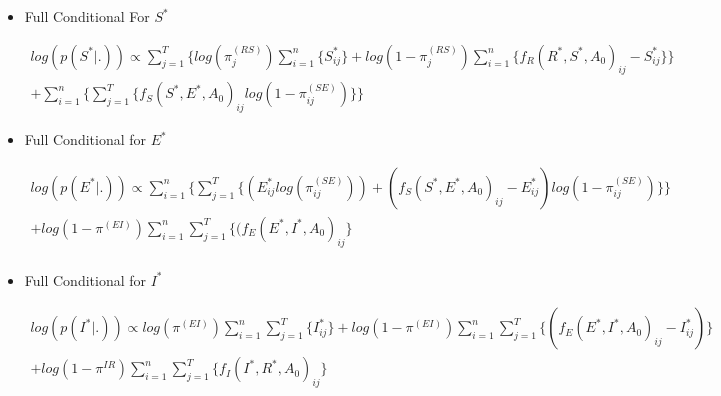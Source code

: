 \documentclass[12pt]{article}
\begin{document}
\begin{itemize}
    \item{Full Conditional For $S^*$}
    \begin{center}
        \begin{multline}
        \displaystyle
        log(p(S^*|.))\propto 
            \sum_{j=1}^T\Big\{log(\pi_j^{(RS)})\sum_{i=1}^n\{S^*_{ij}\} + 
                log(1-\pi_j^{(RS)})\sum_{i=1}^n\{f_R(R^*, S^*, A_0)_{ij} - S^*_{ij}\}\Big\}\\ 
                +\sum_{i=1}^n \bigg\{ \sum_{j=1}^T\Big\{
                f_S(S^*, E^*, A_0)_{ij}log(1-\pi_{ij}^{(SE)})\Big\}\bigg\}
        \end{multline}
    \end{center}

    \item{Full Conditional for $E^*$}
    \begin{center}
    \begin{multline}
        \displaystyle
        log(p(E^*|.))\propto \sum_{i=1}^n \bigg\{ \sum_{j=1}^T\Big\{
                (E^*_{ij}log(\pi_{ij}^{(SE)})) + (f_S(S^*, E^*, A_0)_{ij} - E^*_{ij})log(1-\pi_{ij}^{(SE)})\Big\}\bigg\} \\
                + log(1-\pi^{(EI)})\sum_{i=1}^n\sum_{j=1}^T\{(f_E(E^*, I^*, A_0)_{ij}\}\\
    \end{multline}
    \end{center}

    \item{Full Conditional for $I^*$}
    \begin{center}
    \begin{multline}
        \displaystyle
        log(p(I^*|.)) \propto log(\pi^{(EI)})\sum_{i=1}^n\sum_{j=1}^T\{I^*_{ij}\} 
            + log(1-\pi^{(EI)})\sum_{i=1}^n\sum_{j=1}^T\{(f_E(E^*, I^*, A_0)_{ij} - I^*_{ij})\}\\
            + log(1-\pi^{IR})\sum_{i=1}^n\sum_{j=1}^T\{ f_I(I^*, R^*, A_0)_{ij}\}\\
    \end{multline}
    \end{center}


\end{itemize}
\end{document}

